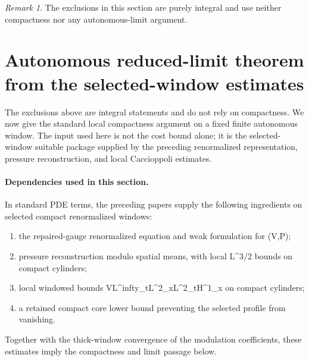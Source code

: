 \documentclass[11pt]{amsart}
\def\({}%
\def\){}%
\def\infty{infty}%
\theoremstyle{plain}
\theoremstyle{definition}
\theoremstyle{remark}
\newtheorem{remark}[theorem]{Remark}
\begin{document}
\begin{remark}
The exclusions in this section are purely integral and use neither compactness nor any
autonomous-limit argument.
\end{remark}

\section{Autonomous reduced-limit theorem from the selected-window estimates}
\label{sec:autonomous}

The exclusions above are integral statements and do not rely on compactness.  We now give the
standard local compactness argument on a fixed finite autonomous window.  The input used here is
not the cost bound alone; it is the selected-window suitable package supplied by the preceding
renormalized representation, pressure reconstruction, and local Caccioppoli estimates.

\paragraph{Dependencies used in this section.}
In standard PDE terms, the preceding papers supply the following ingredients on selected compact
renormalized windows:
\begin{enumerate}[label=(\arabic*)]
  \item the repaired-gauge renormalized equation and weak formulation for \((V,P)\);
  \item pressure reconstruction modulo spatial means, with local \(L^{3/2}\) bounds on compact
    cylinders;
  \item local windowed bounds
  \(V\in L^\infty_tL^2_x\cap L^2_tH^1_x\) on compact cylinders;
  \item a retained compact core lower bound preventing the selected profile from vanishing.
\end{enumerate}
Together with the thick-window convergence of the modulation coefficients, these estimates imply
the compactness and limit passage below.
\end{document}
